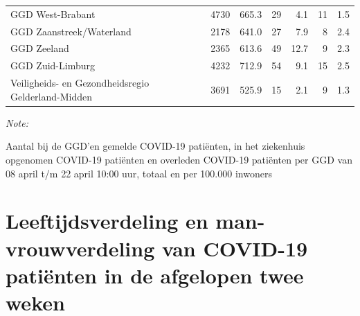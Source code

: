 \documentclass[
  english,
  man,floatsintext]{apa6}
\begin{document}
\begin{table}
\begin{threeparttable}
\begin{tabular}{lrrrrrr}
GGD West-Brabant & 4730 & 665.3 & 29 & 4.1 & 11 & 1.5\\
GGD Zaanstreek/Waterland & 2178 & 641.0 & 27 & 7.9 & 8 & 2.4\\
GGD Zeeland & 2365 & 613.6 & 49 & 12.7 & 9 & 2.3\\
GGD Zuid-Limburg & 4232 & 712.9 & 54 & 9.1 & 15 & 2.5\\
Veiligheids- en Gezondheidsregio Gelderland-Midden & 3691 & 525.9 & 15 & 2.1 & 9 & 1.3\\
\bottomrule
\end{tabular}
\begin{tablenotes}
\item \textit{Note: } 
\item Aantal bij de GGD’en gemelde COVID-19 patiënten, in het ziekenhuis opgenomen COVID-19 patiënten en overleden COVID-19 patiënten per GGD van 08 april t/m 22 april 10:00 uur, totaal en per 100.000 inwoners
\end{tablenotes}
\end{threeparttable}
\endgroup{}
\end{table}

\newpage

\hypertarget{leeftijdsverdeling-en-man-vrouwverdeling-van-covid-19-patiuxebnten-in-de-afgelopen-twee-weken}{%
\section{Leeftijdsverdeling en man-vrouwverdeling van COVID-19 patiënten in de afgelopen twee weken}\label{leeftijdsverdeling-en-man-vrouwverdeling-van-covid-19-patiuxebnten-in-de-afgelopen-twee-weken}}
\end{document}

